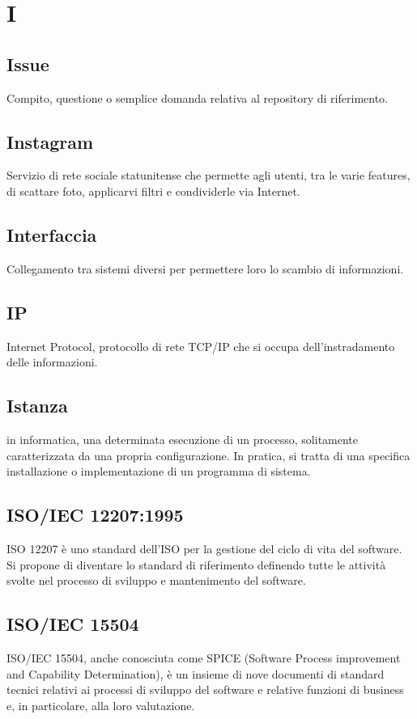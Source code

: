 \documentclass{classes/base}
\begin{document}
    \section{I}
        \subsection*{Issue}
        Compito, questione o semplice domanda relativa al repository di riferimento.
        
        \subsection*{Instagram}
        Servizio di rete sociale statunitense che permette agli utenti, tra le varie features, di scattare foto, applicarvi filtri e condividerle via Internet.
        
        \subsection*{Interfaccia}
        Collegamento tra sistemi diversi per permettere loro lo scambio di informazioni.

        \subsection*{IP}
        Internet Protocol, protocollo di rete TCP/IP che si occupa dell'instradamento delle informazioni.

        \subsection*{Istanza}
        in informatica, una determinata esecuzione di un processo, solitamente caratterizzata da una propria configurazione. In pratica, si tratta di una specifica installazione o implementazione di un programma di sistema.
        
        \subsection*{ISO/IEC 12207:1995}   
        ISO 12207 è uno standard dell'ISO per la gestione del ciclo di vita del software. 
        Si propone di diventare lo standard di riferimento definendo tutte le attività svolte nel processo di sviluppo e mantenimento del software. 

        \subsection*{ISO/IEC 15504}
        ISO/IEC 15504, anche conosciuta come SPICE (Software Process improvement and Capability Determination),
        è un insieme di nove documenti di standard tecnici relativi ai processi di sviluppo del software e relative funzioni di business e, in particolare, alla loro valutazione.
        
\end{document}
